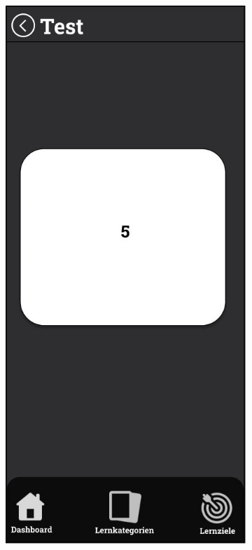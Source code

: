 \newpage

\begin{figure}[htbp]
  \centering
  \begin{subfigure}[b]{0.45\linewidth}
    \centering
    \includegraphics[width=\linewidth]{images/Mockups/TestAntwort.JPG}

\end{subfigure}
\end{figure}
